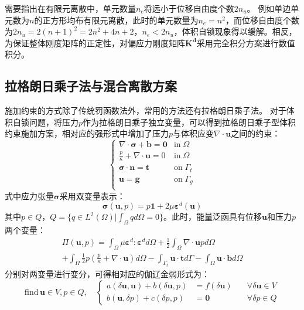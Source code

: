 需要指出在有限元离散中，单元数量$n_e$将远小于位移自由度个数$2n_u$。
例如单边单元数为$n$的正方形均布有限元离散，此时的单元数量为$n_e = n^2$，而位移自由度个数为$2n_u = 2(n+1)^2 = 2n^2+4n+2$，$n_e < 2n_u$，体积自锁现象得以缓解。相反，为保证整体刚度矩阵的正定性，对偏应力刚度矩阵$\boldsymbol{K^d}$采用完全积分方案进行数值积分。

\subsection{拉格朗日乘子法与混合离散方案}
施加约束的方式除了传统罚函数法外，常用的方法还有拉格朗日乘子法。
对于体积自锁问题，将压力$p$作为拉格朗日乘子独立变量，可以得到拉格朗日乘子型体积约束施加方案，相对应的强形式中增加了压力$p$与体积应变$\nabla \cdot \boldsymbol u$之间的约束：
\begin{equation}\label{strong_mix}
    \begin{cases}
        \nabla \cdot \boldsymbol \sigma + \boldsymbol b = \boldsymbol 0 & \mathrm{in} \; \Omega \\
        \frac{p}{\kappa} + \nabla \cdot \boldsymbol u = 0 & \mathrm{in} \; \Omega \\
        \boldsymbol \sigma \cdot \boldsymbol n = \boldsymbol t & \mathrm{on} \; \Gamma_t \\
        \boldsymbol u = \boldsymbol g & \mathrm{on} \; \Gamma_g \\
    \end{cases}
\end{equation}
式中应力张量$\boldsymbol \sigma$采用双变量表示：
\begin{equation}\label{stress_mix}
    \boldsymbol \sigma(\boldsymbol u, p) = p \boldsymbol 1 + 2\mu \boldsymbol \varepsilon^d(\boldsymbol u)
\end{equation}
其中$p\in Q$，$Q = \{q \in L^2(\Omega) \vert \int_{\Omega} q d\Omega = 0\}$。此时，能量泛函具有位移$\boldsymbol u$和压力$p$两个变量：
\begin{multline}
    \Pi(\boldsymbol u, p) =
    \int_\Omega \mu \boldsymbol \varepsilon^d:\boldsymbol \varepsilon^d d\Omega + 
    \frac{1}{2} \int_\Omega \nabla \cdot \boldsymbol u p d\Omega \\ +
    \int_\Omega \frac{1}{2}p(\frac{p}{\kappa} + \nabla \cdot \boldsymbol u) d\Omega
    - \int_{\Gamma_t} \boldsymbol u\cdot \boldsymbol t d\Gamma
    - \int_\Omega \boldsymbol u \cdot \boldsymbol b d\Omega
\end{multline}
分别对两变量进行变分，可得相对应的伽辽金弱形式为：
\begin{equation}\label{ch_2:eq:weak_mix}
    \text{find}\, \boldsymbol u \in V, p \in Q, \quad
    \left \{
        \begin{aligned}
            a(\delta \boldsymbol u, \boldsymbol u) + 
            b(\delta \boldsymbol u, p) &= 
            f(\delta \boldsymbol u) \quad &\forall \delta \boldsymbol u \in V \\
            b(\boldsymbol u, \delta p) +  c(\delta p,p)&= \boldsymbol 0
            \quad &\forall \delta p \in Q
        \end{aligned}
    \right .
\end{equation}
